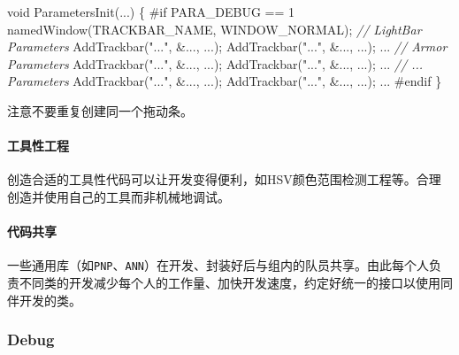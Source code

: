 \documentclass[
]{article}
\newenvironment{Shaded}{}{}
\newcommand{\CommentTok}[1]{\textcolor[rgb]{0.38,0.63,0.69}{\textit{#1}}}
\newcommand{\DataTypeTok}[1]{\textcolor[rgb]{0.56,0.13,0.00}{#1}}
\newcommand{\NormalTok}[1]{#1}
\newcommand{\OperatorTok}[1]{\textcolor[rgb]{0.40,0.40,0.40}{#1}}
\newcommand{\PreprocessorTok}[1]{\textcolor[rgb]{0.74,0.48,0.00}{#1}}
\newcommand{\StringTok}[1]{\textcolor[rgb]{0.25,0.44,0.63}{#1}}
\begin{document}
\begin{Shaded}
\begin{Highlighting}[]
\DataTypeTok{void}\NormalTok{ ParametersInit}\OperatorTok{(...)} \OperatorTok{\{}
\PreprocessorTok{\#if PARA\_DEBUG == 1}
\NormalTok{	namedWindow}\OperatorTok{(}\NormalTok{TRACKBAR\_NAME}\OperatorTok{,}\NormalTok{ WINDOW\_NORMAL}\OperatorTok{);}
	\CommentTok{// LightBar Parameters}
\NormalTok{	AddTrackbar}\OperatorTok{(}\StringTok{"..."}\OperatorTok{,} \OperatorTok{\&...,} \OperatorTok{...);}
\NormalTok{	AddTrackbar}\OperatorTok{(}\StringTok{"..."}\OperatorTok{,} \OperatorTok{\&...,} \OperatorTok{...);}
    \OperatorTok{...}
	\CommentTok{// Armor Parameters}
\NormalTok{	AddTrackbar}\OperatorTok{(}\StringTok{"..."}\OperatorTok{,} \OperatorTok{\&...,} \OperatorTok{...);}
\NormalTok{	AddTrackbar}\OperatorTok{(}\StringTok{"..."}\OperatorTok{,} \OperatorTok{\&...,} \OperatorTok{...);}
    \OperatorTok{...}
	\CommentTok{// ... Parameters}
\NormalTok{	AddTrackbar}\OperatorTok{(}\StringTok{"..."}\OperatorTok{,} \OperatorTok{\&...,} \OperatorTok{...);}
\NormalTok{	AddTrackbar}\OperatorTok{(}\StringTok{"..."}\OperatorTok{,} \OperatorTok{\&...,} \OperatorTok{...);}
    \OperatorTok{...}
\PreprocessorTok{\#endif}
\OperatorTok{\}}
\end{Highlighting}
\end{Shaded}

注意不要重复创建同一个拖动条。

\hypertarget{ux5de5ux5177ux6027ux5de5ux7a0b}{%
\paragraph{工具性工程}\label{ux5de5ux5177ux6027ux5de5ux7a0b}}

创造合适的工具性代码可以让开发变得便利，如HSV颜色范围检测工程等。合理创造并使用自己的工具而非机械地调试。

\hypertarget{ux4ee3ux7801ux5171ux4eab}{%
\paragraph{代码共享}\label{ux4ee3ux7801ux5171ux4eab}}

一些通用库（如\texttt{PNP}、\texttt{ANN}）在开发、封装好后与组内的队员共享。由此每个人负责不同类的开发减少每个人的工作量、加快开发速度，约定好统一的接口以使用同伴开发的类。

\hypertarget{debug}{%
\subsubsection{Debug}\label{debug}}
\end{document}
